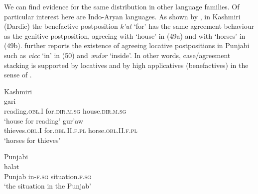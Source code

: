 \documentclass[output=paper]{langsci/langscibook}
\begin{document}
We can find evidence for the same distribution in other language families. Of particular interest here are Indo-Aryan languages. As shown by \citet{Payne1995}, in Kashmiri (Dardic) the benefactive postposition \textit{k’ut} ‘for’ has the same agreement behaviour as the genitive postposition, agreeing with ‘house’ in (49a) and with ‘horses’ in (49b). \citet{Payne1995} further reports the existence of agreeing locative postpositions in Punjabi such as \textit{vicc} ‘in’ in (50) and \textit{ənd}\textit{ər} ‘inside’. In other words, case\slash agreement stacking is supported by locatives and by high applicatives (benefactives) in the sense of \citet{Pylkkänen2008}.

\ea%
    Kashmiri \citep[293]{Payne1995}\label{ex:manzini:49}\\
    \ea
    \gll\relax [ paranas     k'ut]     gari \\
         {} reading.\textsc{obl}.I   for.\textsc{dir.m.sg}  house.\textsc{dir.m.sg}\\
    \glt ‘house for reading’  
    \ex  
    \gll\relax [ cur'an     k'it'aw]     gur'aw\\
         {} thieves.\textsc{obl}.I   for.\textsc{obl}.II.\textsc{f.pl}   horse.\textsc{obl.II.f.pl}\\
    \glt ‘horses for thieves’
    \z
\z

          

    

\ea%
         Punjabi \citep[289]{Payne1995}\label{ex:manzini:50}\\
    \gll [ pənj\=ab  vicl-\=\i]    h\=alət        \\
         {} Punjab   in-\textsc{f.sg}  situation.\textsc{f.sg}\\
    \glt ‘the situation in the Punjab’ 
    \z
\end{document}
